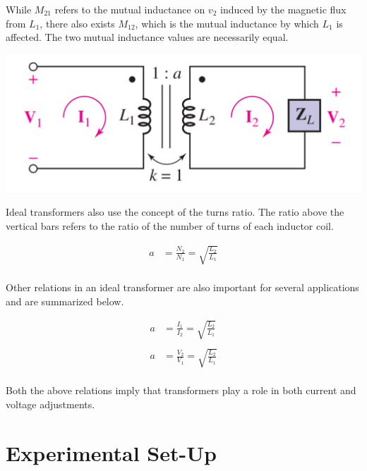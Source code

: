 \documentclass[journal]{IEEEtran}
\begin{document}
\noindent While $M_{21}$ refers to the mutual inductance on $v_2$ induced by the magnetic flux from $L_1$, there also exists $M_{12}$, which is the mutual inductance by which $L_1$ is affected. The two mutual inductance values are necessarily equal. 

\begingroup
    \centering
    \medskip
    \includegraphics[width=\columnwidth]{images/labx_2.PNG}
    \label{fig:idealtransformer}
    \medskip
\endgroup

\noindent Ideal transformers also use the concept of the turns ratio. The ratio above the vertical bars refers to the ratio of the number of turns of each inductor coil. 

\begin{equation}
    \begin{split}
        a & = \frac{N_2}{N_1} = \sqrt{\frac{L_2}{L_1}}\\
    \end{split}
    \label{eq:mutual}
\end{equation}

\noindent Other relations in an ideal transformer are also important for several applications and are summarized below.

\begin{equation}
    \begin{split}
        a & = \frac{I_1}{I_2} = \sqrt{\frac{L_2}{L_1}}\\ \\
        a & = \frac{V_2}{V_1} = \sqrt{\frac{L_2}{L_1}}\\
    \end{split}
    \label{eq:mutual}
\end{equation}

\noindent Both the above relations imply that transformers play a role in both current and voltage adjustments. 

\section{Experimental Set-Up}
\end{document}
